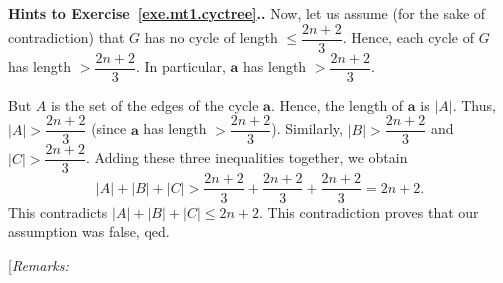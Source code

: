 \documentclass[numbers=enddot,12pt,final,onecolumn,notitlepage]{scrartcl}%
\theoremstyle{definition}
\newenvironment{proof}[1][Proof]{\noindent\textbf{#1.} }{\ \rule{0.5em}{0.5em}}
\newenvironment{noncompile}{}{}
\newcommand{\abs}[1]{\left| #1 \right|}
\begin{document}
\begin{noncompile}
\begin{proof}[Hints to Exercise~\ref{exe.mt1.cyctree}.]
Now, let us assume (for the sake of contradiction) that
$G$ has no cycle of length $\leq \dfrac{2n+2}{3}$. Hence, each cycle
of $G$ has length $> \dfrac{2n+2}{3}$. In particular, $\mathbf{a}$
has length $> \dfrac{2n+2}{3}$.

But $A$ is the set of the edges of the cycle $\mathbf{a}$. Hence, the
length of $\mathbf{a}$ is $\abs{A}$. Thus, $\abs{A} > \dfrac{2n+2}{3}$
(since $\mathbf{a}$ has length $> \dfrac{2n+2}{3}$). Similarly,
$\abs{B} > \dfrac{2n+2}{3}$ and $\abs{C} > \dfrac{2n+2}{3}$. Adding
these three inequalities together, we obtain
\[
\abs{A} + \abs{B} + \abs{C}
> \dfrac{2n+2}{3} + \dfrac{2n+2}{3} + \dfrac{2n+2}{3}
= 2n+2 .
\]
This contradicts $\abs{A} + \abs{B} + \abs{C} \leq 2n+2$.
This contradiction proves that our assumption was false, qed.
\end{noncompile}

[\textit{Remarks:}
\end{document}

